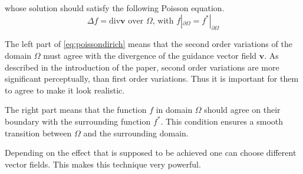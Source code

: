\documentclass[]{book}
\theoremstyle{definition}
\begin{document}
whose solution should satisfy the following Poisson equation.
\begin{equation}
\Delta f = \text{div} \mathbf{v} \text{ over } \Omega\text{, with } f|_{\partial \Omega} = f^*|_{\partial \Omega} \label{eq:poissondirich}
\end{equation}

The left part of \ref{eq:poissondirich} means that the second order variations of the domain $\Omega$ must agree with the divergence of the guidance vector field $\textbf{v}$. As described in the introduction of the paper, second order variations are more significant perceptually, than first order variations. Thus it is important for them to agree to make it look realistic.

The right part means that the function $f$ in domain $\Omega$ should agree on their boundary with the surrounding function $f^*$. This condition ensures a smooth transition between $\Omega$ and the surrounding domain.

Depending on the effect that is supposed to be achieved one can choose different
vector fields. This makes this technique very powerful.
\end{document}
